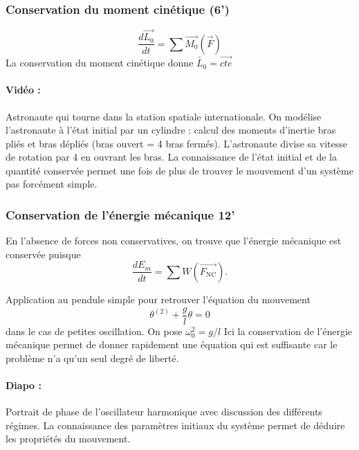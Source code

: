 \subsubsection{Conservation du moment cinétique (6')}

\begin{equation}
\frac{d\overrightarrow{L_0}}{dt} = \sum \overrightarrow{M_0}(\overrightarrow{F})
\end{equation}
La conservation du moment cinétique donne $\overleftarrow{L_0} = \overrightarrow{cte}$

\paragraph{Vidéo :} Astronaute qui tourne dans la station spatiale internationale.
On modélise l'astronaute à l'état initial par un cylindre : calcul des moments d'inertie bras pliés et bras dépliés (bras ouvert = 4 bras fermés).
L'astronaute divise sa vitesse de rotation par 4 en ouvrant les bras.
La connaissance de l'état initial et de la quantité conservée permet une fois de plus de trouver le mouvement d'un système pas forcément simple.

\subsubsection{Conservation de l'énergie mécanique 12'}

En l'absence de forces non conservatives, on trouve que l'énergie mécanique est conservée puisque
\begin{equation}
\frac{dE_m}{dt} = \sum W(\overrightarrow{F_\mathrm{NC}}).
\end{equation}

Application au pendule simple pour retrouver l'équation du mouvement
\begin{equation}
\theta^{(2)} + \frac{g}{l}\theta = 0
\end{equation}
dans le cas de petites oscillation.
On pose $\omega_0^2=g/l$
Ici la conservation de l'énergie mécanique permet de donner rapidement une équation qui est suffisante car le problème n'a qu'un seul degré de liberté.

\paragraph{Diapo :} Portrait de phase de l'oscillateur harmonique avec discussion des différents régimes.
La connaissance des paramètres initiaux du système permet de déduire les propriétés du mouvement.


